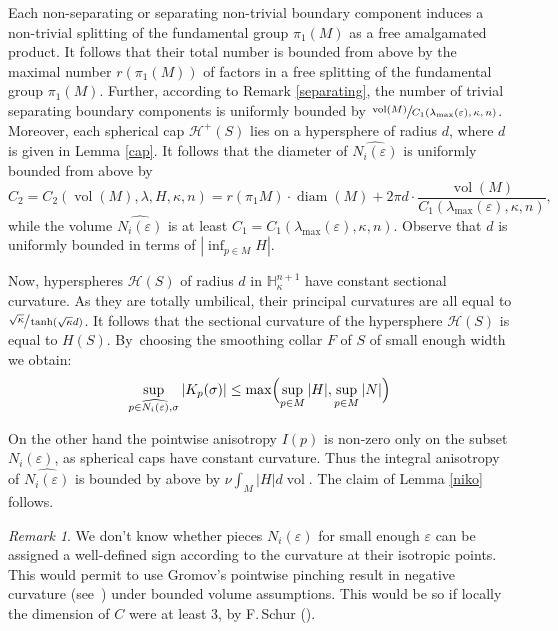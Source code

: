 \documentclass[10pt]{amsart}
\let\mathcal\mathscr
\DeclareMathOperator{\diam}{diam}
\DeclareMathOperator{\vol}{vol}
\theoremstyle{definition}
\theoremstyle{remark}
\newtheorem{remark}[theorem]{Remark}
\numberwithin{equation}{section}
\begin{document}
Each non-separating or separating non-trivial boundary component induces a non-trivial splitting of the
fundamental group $\pi_1(M)$ as a free amalgamated product. It follows that their total number is bounded from above by the
maximal number $r(\pi_1(M))$ of factors in a free splitting of the
fundamental group $\pi_1(M)$. Further, accor\-ding to Remark \ref{separating}, the number of trivial separating boundary components is uniformly bounded by $\sfrac{\vol(M)}{C_1(\lambda_{\max}(\varepsilon),\kappa,n)}$.
Moreover, each spherical cap $\mathcal H^+(S)$ lies on a hypersphere of radius $d$, where $d$ is given in Lemma \ref{cap}.
It follows that the diameter of $\widehat{N_i(\varepsilon)}$ is uniformly bounded from above by
\[ C_2=C_2(\vol(M),\lambda,H, \kappa,n)=
r(\pi_1M)\cdot \diam(M) + 2\pi d\cdot \frac{\vol(M)}{C_1(\lambda_{\max}(\varepsilon),\kappa,n)},\]
while the volume $\widehat{N_i(\varepsilon)}$ is at least
$C_1=C_1(\lambda_{\max}(\varepsilon), \kappa, n)$. Observe that $d$ is uniformly bounded
in terms of $|\inf_{p\in M}H|$.

Now, hyperspheres $\mathcal H(S)$ of radius $d$ in $\mathbb H^{n+1}_{\kappa}$ have
constant sectional curvature. As they are totally umbilical, their principal curvatures
are all equal to $\sfrac{\sqrt{\kappa}}{\tanh(\sqrt{\kappa}d)}$. It follows that the sectional curvature
of the hypersphere $\mathcal H(S)$ is equal to $H(S)$. By~choosing the
smoothing collar $F$ of $S$ of small enough width we obtain:
\[\sup_{p\in \widehat{N_i(\varepsilon)}, \sigma}|K_p(\sigma)|
\leq
\max\Bigl(\sup_{p\in M}|H|,\sup_{p\in M}|N|\Bigr)\]

On the other hand the pointwise anisotropy $I(p)$ is non-zero
only on the subset $N_i(\varepsilon)$, as spherical caps have
constant curvature. Thus the integral anisotropy
of $\widehat{N_i(\varepsilon)}$ is
bounded by above by $\nu\int_M |H| d\vol$.
The claim of Lemma \ref{niko} follows.

\begin{remark}
We don't know whether pieces $N_i(\varepsilon)$
for small enough $\varepsilon$ can be assigned a well-defined
sign according to the curvature at their
isotropic points. This would permit to use
Gromov's pointwise pinching result in negative curvature (see~\cite{Gro})
under bounded volume assumptions.
This would be so if locally the dimension of $C$ were at least $3$,
by F.\,Schur (\cite{Sch}).
\end{remark}
\end{document}

